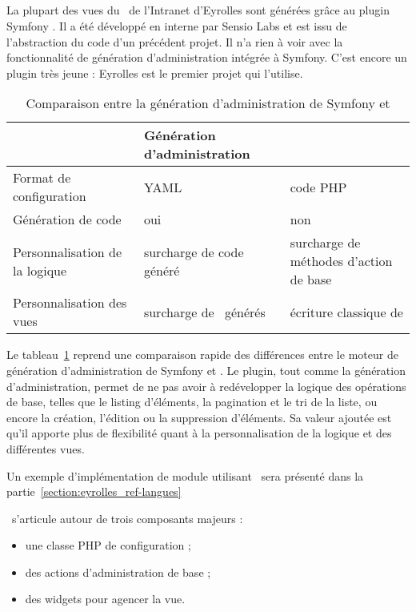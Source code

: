 \subsection{\asladmin}

La plupart des vues du \alotdeux\ de l'Intranet d'Eyrolles sont générées grâce au plugin Symfony \asladmin. Il a été développé en interne par Sensio Labs et est issu de l'abstraction du code d'un précédent projet. Il n'a rien à voir avec la fonctionnalité de génération d'administration intégrée à Symfony. C'est encore un plugin très jeune : Eyrolles est le premier projet qui l'utilise.

\begin{table}
	\centering
	\begin{tabular}{|p{3cm}||p{4.5cm}|p{4.5cm}|}
		\hline
		& Génération d'administration & \asladmin\ \tabularnewline
		\hline
		\hline
		Format de configuration & YAML & code PHP \tabularnewline
		\hline
		Génération de code & oui & non \tabularnewline
		\hline
		Personnalisation de la logique & surcharge de code généré & surcharge de méthodes d'action de base \tabularnewline
		\hline
		Personnalisation des vues & surcharge de \apartials\ générés & écriture classique de \atemplates \tabularnewline
		\hline
	\end{tabular}
	\caption{Comparaison entre la génération d'administration de Symfony et \asladmin}
	\label{table:eyrolles_sladmin_sladmin-vs-admin-gen}
\end{table}

Le tableau~\ref{table:eyrolles_sladmin_sladmin-vs-admin-gen} reprend une comparaison rapide des différences entre le moteur de génération d'administration de Symfony et \asladmin. Le plugin, tout comme la génération d'administration, permet de ne pas avoir à redévelopper la logique des opérations de base, telles que le listing d'éléments, la pagination et le tri de la liste, ou encore la création, l'édition ou la suppression d'éléments. Sa valeur ajoutée est qu'il apporte plus de flexibilité quant à la personnalisation de la logique et des différentes vues.

Un exemple d'implémentation de module utilisant \asladmin\ sera présenté dans la partie~\ref{section:eyrolles_ref-langues}

\asladmin\ s'articule autour de trois composants majeurs :
\begin{itemize}
	\item une classe PHP de configuration ;
	\item des actions d'administration de base ;
	\item des widgets pour agencer la vue.
\end{itemize}



